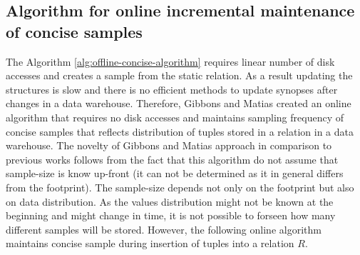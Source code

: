 \subsection{Algorithm for online incremental maintenance of concise samples}
The Algorithm \ref{alg:offline-concise-algorithm} requires
linear number of disk accesses and creates a sample from the static
relation. As a result updating the structures is slow and there is no
efficient methods to update synopses after changes in a data warehouse.
Therefore, Gibbons and Matias \cite{GM98} created an online algorithm that requires no disk
accesses and maintains sampling frequency of concise samples that
reflects distribution of tuples stored in a relation in a data warehouse.
The novelty of Gibbons and Matias \cite{GM98} approach in comparison to previous
works follows from the fact that this algorithm do not assume that
sample-size is know up-front (it can not be determined as it in
general differs from the footprint).
The sample-size depends not only on the footprint but also on data
distribution. As the values distribution might not be known at the beginning
and might change in time, it is not possible to forseen how many different
samples will be stored. However, the following online algorithm maintains concise
sample during insertion of tuples into a relation $R$.

\begin{center}
    \label{alg:maintenance-concise-algorithm}
    \begin{algorithmic}
    \EndIf
    \EndIf
    \EndFunction
    \State
    \EndFor
    \EndIf
    \EndIf
    \EndFor
    \EndFunction
  \end{algorithmic}
\end{center}


